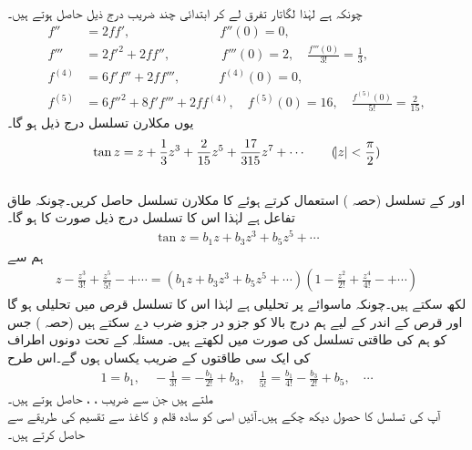 چونکہ  ہے لہٰذا لگاتار تفرق لے کر ابتدائی چند  ضریب  درج ذیل حاصل ہوتے ہیں۔
\begin{align*}
f''&=2ff',\quad \quad\quad \quad \quad \quad \quad  f''(0)=0,\\
f'''&=2f'^2+2ff'',\quad \quad\quad \quad  f'''(0)=2, \quad \frac{f'''(0)}{3!}=\frac{1}{3},\\
f^{(4)}&=6f'f''+2ff''',\quad \quad \quad f^{(4)}(0)=0,\\
f^{(5)}&=6f''^2+8f'f'''+2ff^{(4)},\quad f^{(5)}(0)=16,\quad \frac{f^{(5)}(0)}{5!}=\frac{2}{15},
\end{align*}
یوں مکلارن تسلسل درج ذیل ہو گا۔
\begin{align}
\tan z=z+\frac{1}{3}z^3+\frac{2}{15}z^5+\frac{17}{315}z^7+\cdots \quad \quad (\abs{z}<\frac{\pi}{2})
\end{align}
\quad {}\\
 اور  کے تسلسل (حصہ ) استعمال کرتے ہوئے  کا مکلارن تسلسل حاصل کریں۔چونکہ  طاق تفاعل ہے لہٰذا اس کا تسلسل درج ذیل صورت کا ہو گا۔
\begin{align*}
\tan z=b_1z+b_3z^3+b_5z^5+\cdots
\end{align*}
ہم سے 
\begin{align*}
z-\frac{z^3}{3!}+\frac{z^5}{5!}-+\cdots=(b_1z+b_3z^3+b_5z^5+\cdots)(1-\frac{z^2}{2!}+\frac{z^4}{4!}-+\cdots)
\end{align*}
لکھ سکتے ہیں۔چونکہ  ماسوائے  پر تحلیلی ہے لہٰذا اس کا تسلسل قرص  میں تحلیلی ہو گا اور قرص کے اندر  کے لیے ہم درج بالا کو جزو در جزو ضرب دے سکتے ہیں (حصہ ) جس کو ہم   کی طاقتی تسلسل کی صورت میں لکھتے ہیں۔ مسئلہ  کے تحت دونوں اطراف  کی ایک  سی طاقتوں کے  ضریب  یکساں ہوں گے۔اس طرح 
\begin{align*}
1=b_1,\quad -\frac{1}{3!}=-\frac{b_1}{2!}+b_3, \quad \frac{1}{5!}=\frac{b_1}{4!}-\frac{b_3}{2!}+b_5,\quad \cdots
\end{align*} 
ملتے ہیں جن سے  ضریب  ، ،  حاصل ہوتے ہیں۔
\quad {}\\
آپ   کی تسلسل کا حصول دیکھ چکے ہیں۔آئیں اسی کو سادہ قلم و کاغذ سے تقسیم کی طریقے سے حاصل کرتے ہیں۔
